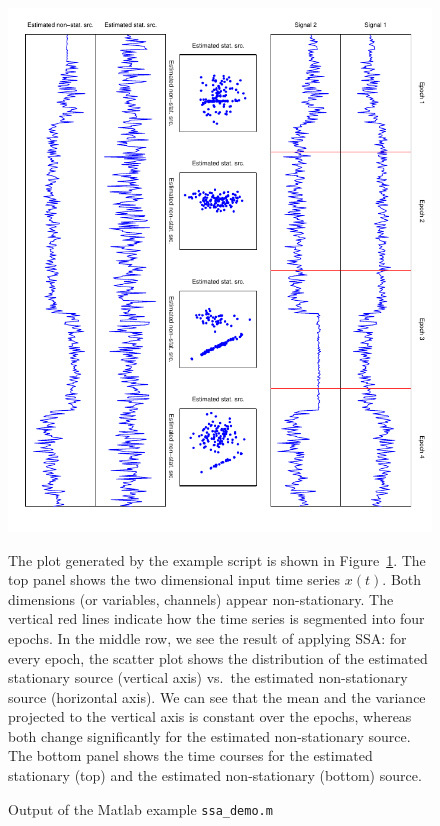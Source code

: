 \documentclass{article}
\newcommand{\1}{\ensuremath{\mathds{1}}}
\newcommand{\0}{\ensuremath{0}}
\begin{document}
\begin{figure}
\begin{center}
	\includegraphics[angle=90,width=12.5cm]{ssa_example.pdf}
	\caption{\label{fig:matlab_example}
		Output of the Matlab example \texttt{ssa\_demo.m}} 
\end{center}

The plot generated by the example script is shown in Figure~\ref{fig:matlab_example}. The top panel
shows the two dimensional input time series $x(t)$. Both dimensions (or variables, channels) appear
non-stationary. The vertical red lines indicate how the time series is segmented into four epochs. 
In the middle row, we see the result of applying SSA: for every epoch, the scatter plot shows
the distribution of the estimated stationary source (vertical axis) vs.~the estimated non-stationary 
source (horizontal axis). We can see that the mean and the variance projected to the vertical axis
is constant over the epochs, whereas both change significantly for the estimated non-stationary source. 
The bottom panel shows the time courses for the estimated stationary (top) and the estimated non-stationary 
(bottom) source. 
\end{figure}
\end{document}
